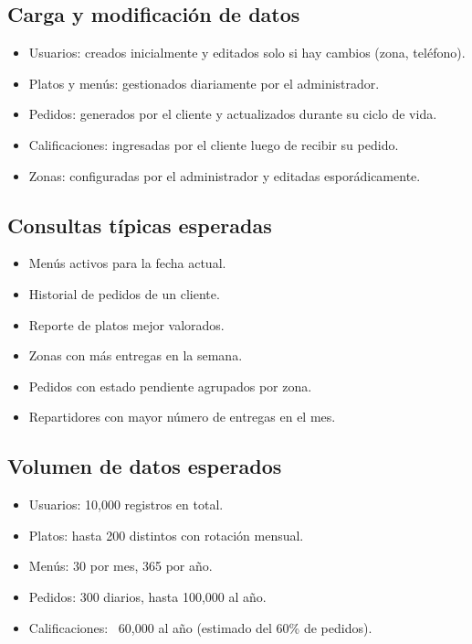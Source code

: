 \documentclass[12pt,a4paper]{article}
\begin{document}
\subsection{Carga y modificación de datos}
\begin{itemize}
  \item Usuarios: creados inicialmente y editados solo si hay cambios (zona, teléfono).
  \item Platos y menús: gestionados diariamente por el administrador.
  \item Pedidos: generados por el cliente y actualizados durante su ciclo de vida.
  \item Calificaciones: ingresadas por el cliente luego de recibir su pedido.
  \item Zonas: configuradas por el administrador y editadas esporádicamente.
\end{itemize}

\subsection{Consultas típicas esperadas}
\begin{itemize}
  \item Menús activos para la fecha actual.
  \item Historial de pedidos de un cliente.
  \item Reporte de platos mejor valorados.
  \item Zonas con más entregas en la semana.
  \item Pedidos con estado pendiente agrupados por zona.
  \item Repartidores con mayor número de entregas en el mes.
\end{itemize}

\subsection{Volumen de datos esperados}
\begin{itemize}
  \item Usuarios: 10,000 registros en total.
  \item Platos: hasta 200 distintos con rotación mensual.
  \item Menús: 30 por mes, 365 por año.
  \item Pedidos: 300 diarios, hasta 100,000 al año.
  \item Calificaciones: ~60,000 al año (estimado del 60\% de pedidos).
\end{itemize}
\end{document}
